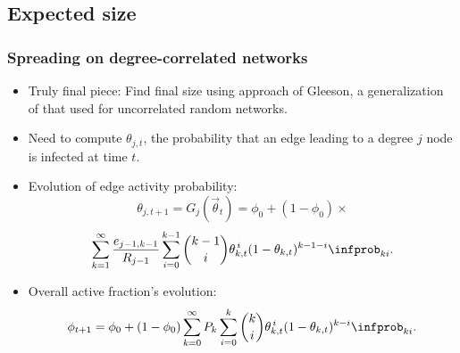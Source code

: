 \subsection{Expected size}

\begin{frame}
  \frametitle{Spreading on degree-correlated networks}

  \begin{itemize}
  \item<1->
    \alert{Truly final piece:} 
    Find final size using approach of Gleeson\cite{gleeson2008a},
    a generalization of that used for uncorrelated random networks.
  \item<2->
    Need to compute $\theta_{j,t}$, the probability that 
    an edge leading to a degree $j$ node is infected at time $t$.
  \item<3->
    Evolution of edge activity probability:
    $$
    \theta_{j,t+1}
    =
    G_j(\vec{\theta}_t)
    =
    \phi_0 + 
    (1-\phi_0) \times
    $$
    $$
    \sum_{k=1}^{\infty}
    \frac{e_{j-1,k-1}}{R_{j-1}}
    \sum_{i=0}^{k-1}
    \binom{k-1}{i}
    \theta_{k,t}^{\, i}
    (1-\theta_{k,t})^{k-1-i}
    \infprob_{ki}.
    $$
  \item<4-> 
    Overall active fraction's evolution:
    $$
    \phi_{t+1}
    =
    \phi_0
    +
    (1-\phi_0)
    \sum_{k=0}^{\infty}
    P_k
    \sum_{i=0}^{k}
    \binom{k}{i}
    \theta_{k,t}^{\, i}
    (1-\theta_{k,t})^{k-i}
    \infprob_{ki}.
    $$
  \end{itemize}

\end{frame}


